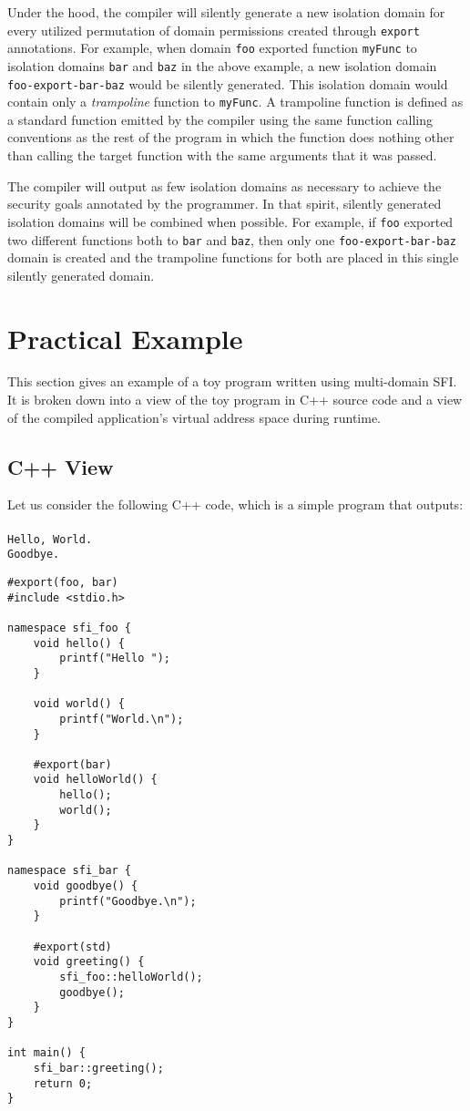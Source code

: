 \documentclass[12pt]{article}
\begin{document}
Under the hood, the compiler will silently generate a new isolation domain for every utilized permutation of domain permissions created through \texttt{export} annotations. For example, when domain \texttt{foo} exported function \texttt{myFunc} to isolation domains \texttt{bar} and \texttt{baz} in the above example, a new isolation domain \texttt{foo-export-bar-baz} would be silently generated. This isolation domain would contain only a \textit{trampoline} function to \texttt{myFunc}. A trampoline function is defined as a standard function emitted by the compiler using the same function calling conventions as the rest of the program in which the function does nothing other than calling the target function with the same arguments that it was passed. 

The compiler will output as few isolation domains as necessary to achieve the security goals annotated by the programmer. In that spirit, silently generated isolation domains will be combined when possible. For example, if \texttt{foo} exported two different functions both to \texttt{bar} and \texttt{baz}, then only one \texttt{foo-export-bar-baz} domain is created and the trampoline functions for both are placed in this single silently generated domain.

\section{Practical Example}

This section gives an example of a toy program written using multi-domain SFI. It is broken down into a view of the toy program in C++ source code and a view of the compiled application's virtual address space during runtime.
\subsection{C++ View}

Let us consider the following C++ code, which is a simple program that outputs:\\ \\
\texttt{Hello, World.\\Goodbye.}

\begin{verbatim}
#export(foo, bar)
#include <stdio.h>

namespace sfi_foo {
	void hello() {
		printf("Hello ");
	}
	
	void world() {
		printf("World.\n");
	}
	
	#export(bar)
	void helloWorld() {
		hello();
		world();
	}
}

namespace sfi_bar {
	void goodbye() {
		printf("Goodbye.\n");
	}
	
	#export(std)
	void greeting() {
		sfi_foo::helloWorld();
		goodbye();
	}
}

int main() {
	sfi_bar::greeting();
	return 0;
}

\end{verbatim}
\end{document}
